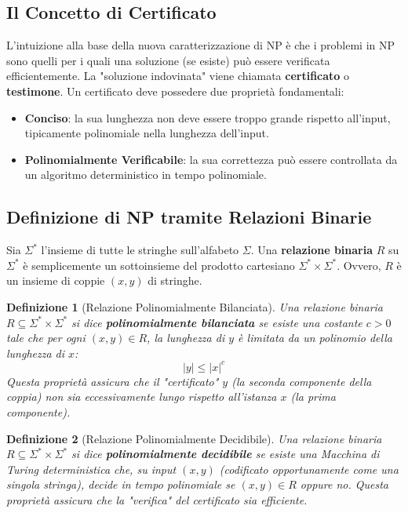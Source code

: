 \documentclass[a4paper]{article}
\newtheorem{definition}{Definizione}
\begin{document}
\subsection{Il Concetto di Certificato}
L'intuizione alla base della nuova caratterizzazione di NP è che i problemi in NP sono quelli per i quali una soluzione (se esiste) può essere verificata efficientemente. La "soluzione indovinata" viene chiamata \textbf{certificato} o \textbf{testimone}.
Un certificato deve possedere due proprietà fondamentali:
\begin{itemize}
    \item \textbf{Conciso}: la sua lunghezza non deve essere troppo grande rispetto all'input, tipicamente polinomiale nella lunghezza dell'input.
    \item \textbf{Polinomialmente Verificabile}: la sua correttezza può essere controllata da un algoritmo deterministico in tempo polinomiale.
\end{itemize}

\subsection{Definizione di NP tramite Relazioni Binarie}

Sia $\Sigma^*$ l'insieme di tutte le stringhe sull'alfabeto $\Sigma$. Una \textbf{relazione binaria} $R$ su $\Sigma^*$ è semplicemente un sottoinsieme del prodotto cartesiano $\Sigma^* \times \Sigma^*$. Ovvero, $R$ è un insieme di coppie $(x, y)$ di stringhe.

\begin{definition}[Relazione Polinomialmente Bilanciata]
Una relazione binaria $R \subseteq \Sigma^* \times \Sigma^*$ si dice \textbf{polinomialmente bilanciata} se esiste una costante $c > 0$ tale che per ogni $(x, y) \in R$, la lunghezza di $y$ è limitata da un polinomio della lunghezza di $x$:
\[ |y| \le |x|^c \]
Questa proprietà assicura che il "certificato" $y$ (la seconda componente della coppia) non sia eccessivamente lungo rispetto all'istanza $x$ (la prima componente).
\end{definition}

\begin{definition}[Relazione Polinomialmente Decidibile]
Una relazione binaria $R \subseteq \Sigma^* \times \Sigma^*$ si dice \textbf{polinomialmente decidibile} se esiste una Macchina di Turing deterministica che, su input $(x, y)$ (codificato opportunamente come una singola stringa), decide in tempo polinomiale se $(x, y) \in R$ oppure no.
Questa proprietà assicura che la "verifica" del certificato sia efficiente.
\end{definition}
\end{document}
